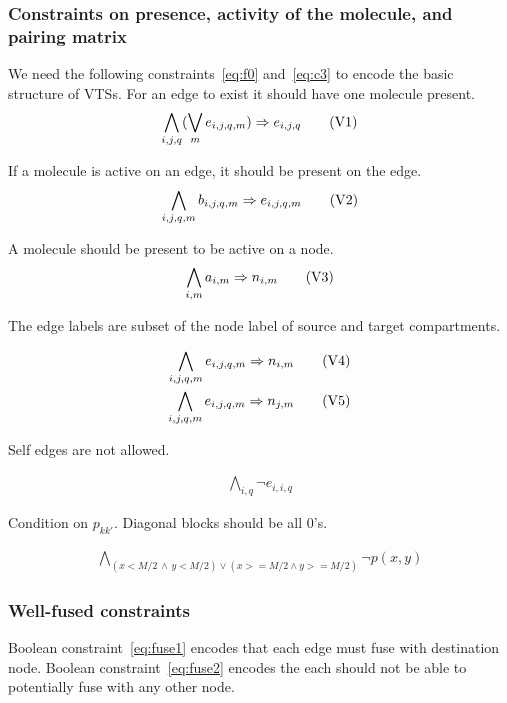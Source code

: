 \subsubsection{Constraints on presence, activity of the molecule, and pairing matrix}
%
We need the following constraints~\eqref{eq:f0} and~\eqref{eq:c3}
to encode the basic structure of VTSs.
%
For an edge to exist it should have one molecule present. 
%
\begin{align}
  \bigwedge\limits_{i,j,q} (\bigvee_m e_{i,j,q,m} )\Rightarrow e_{i,j,q}\tag{V1}\label{eq:f0}
\end{align}

If a molecule is active on an edge, it should be present on the edge.
%
\begin{align}
  \bigwedge\limits_{i,j,q,m} b_{i,j,q,m} \Rightarrow e_{i,j,q,m}\tag{V2}\label{eq:f1}
\end{align}

A molecule should be present to be active on a node.  
\begin{align}
  \bigwedge\limits_{i,m} a_{i,m} \Rightarrow n_{i,m}
  \tag{V3}\label{eq:c4}
\end{align}

The edge labels are subset of the node label of source and target compartments.

\begin{align}
  \bigwedge\limits_{i,j,q,m} e_{i,j,q,m} \Rightarrow n_{i,m}\tag{V4}\label{eq:c0}\\
  \bigwedge\limits_{i,j,q,m}  e_{i,j,q,m} \Rightarrow n_{j,m}\tag{V5}\label{eq:c1}
\end{align}


Self edges are not allowed. 

\begin{align}
   \bigwedge\limits_{i,q} \neg e_{i,i,q}\tag{V6}\label{eq:c2}
\end{align}

Condition on $p_{kk'}$.  Diagonal blocks should be all 0's.

\begin{align}
  \bigwedge\limits_{(x < M/2 \, \land  \, y < M/2) \lor  (x >= M/2 \land y >= M/2)} \neg p(x,y)
  \tag{V7}\label{eq:c3}
\end{align}

\subsubsection{Well-fused constraints}
Boolean constraint~\eqref{eq:fuse1} encodes that each edge must fuse with
destination node.
%
Boolean constraint~\eqref{eq:fuse2} encodes the each should not be able to
potentially fuse with any other node.

